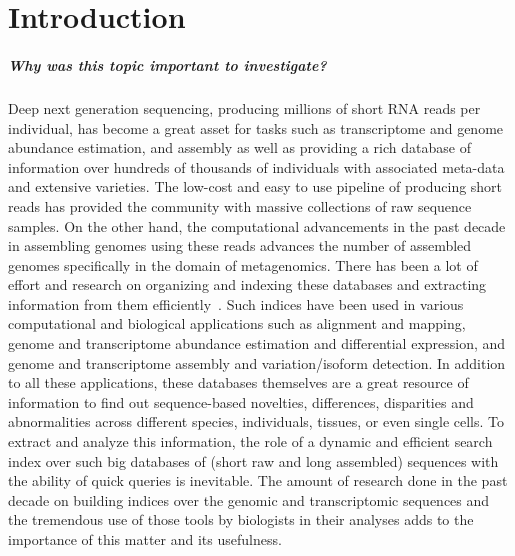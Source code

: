 \chapter{Introduction}

\paragraph*{Why was this topic important to investigate?}

Deep next generation sequencing, producing millions of short RNA reads per individual,
has become a great asset for tasks such as transcriptome and genome abundance estimation, and
assembly as well as providing a rich database of information over hundreds of thousands of individuals
with associated meta-data and extensive varieties. The low-cost and easy to use pipeline of
producing short reads has provided the community with massive collections of raw sequence samples.
On the other hand, the computational advancements in the past decade in assembling genomes
using these reads advances the number of
assembled genomes specifically in the domain of metagenomics.
There has been a lot of effort and research on organizing and indexing these databases
and extracting information from them efficiently~\cite{paten2017genome}.
Such indices have been used in various computational
and biological applications such as alignment and mapping,
genome and transcriptome abundance estimation and differential expression,
and genome and transcriptome assembly and variation/isoform detection.
In addition to all these applications, these databases themselves are a great resource
of information to find out sequence-based novelties, differences, disparities and abnormalities
across different species, individuals, tissues, or even single cells.
To extract and analyze this information, the role of a dynamic and efficient search index
over such big databases of (short raw and long assembled) sequences
with the ability of quick queries is inevitable.
The amount of research done in the past decade on building indices over
the genomic and transcriptomic sequences and the tremendous use of those tools by biologists
in their analyses adds to the importance of this matter and its usefulness.


